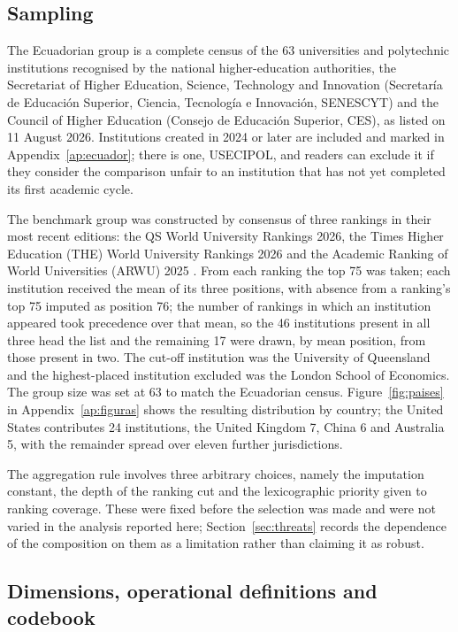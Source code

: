 \documentclass[]{interact}
\begin{document}
\subsection{Sampling}\label{sec:methods-sampling}

The Ecuadorian group is a complete census of the 63 universities and polytechnic institutions recognised by the national higher-education authorities, the Secretariat of Higher Education, Science, Technology and Innovation (Secretar\'ia de Educaci\'on Superior, Ciencia, Tecnolog\'ia e Innovaci\'on, SENESCYT) and the Council of Higher Education (Consejo de Educaci\'on Superior, CES), as listed on 11 August 2026. Institutions created in 2024 or later are included and marked in Appendix~\ref{ap:ecuador}; there is one, USECIPOL, and readers can exclude it if they consider the comparison unfair to an institution that has not yet completed its first academic cycle.

The benchmark group was constructed by consensus of three rankings in their most recent editions: the QS World University Rankings 2026, the Times Higher Education (THE) World University Rankings 2026 and the Academic Ranking of World Universities (ARWU) 2025 \citep{qs2026,the2026,arwu2025}. From each ranking the top 75 was taken; each institution received the mean of its three positions, with absence from a ranking's top 75 imputed as position 76; the number of rankings in which an institution appeared took precedence over that mean, so the 46 institutions present in all three head the list and the remaining 17 were drawn, by mean position, from those present in two. The cut-off institution was the University of Queensland and the highest-placed institution excluded was the London School of Economics. The group size was set at 63 to match the Ecuadorian census. Figure~\ref{fig:paises} in Appendix~\ref{ap:figuras} shows the resulting distribution by country; the United States contributes 24 institutions, the United Kingdom 7, China 6 and Australia 5, with the remainder spread over eleven further jurisdictions.

The aggregation rule involves three arbitrary choices, namely the imputation constant, the depth of the ranking cut and the lexicographic priority given to ranking coverage. These were fixed before the selection was made and were not varied in the analysis reported here; Section~\ref{sec:threats} records the dependence of the composition on them as a limitation rather than claiming it as robust.

\subsection{Dimensions, operational definitions and codebook}\label{sec:methods-codebook}
\end{document}
